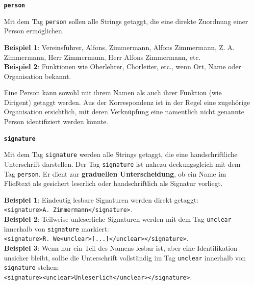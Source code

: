 \documentclass[12pt, a4paper, ngerman, bidi=default]{article}
\begin{document}
    \begin{description}
    \item \textbf{\colorbox{person}{\texttt{person}}}
        
    Mit dem Tag \texttt{\colorbox{person}{person}} sollen alle Strings getaggt, die eine direkte Zuordnung einer Person ermöglichen.
    
    \noindent \textbf{ Beispiel 1}: Vereinsführer, Alfons, Zimmermann, Alfons Zimmermann, Z. A. Zimmermann, Herr Zimmermann, Herr Alfons Zimmermann, etc. \\
    \textbf{ Beispiel 2}: Funktionen wie Oberlehrer, Chorleiter, etc., wenn Ort, Name oder Organisation bekannt. 
    
    Eine Person kann sowohl mit ihrem Namen als auch ihrer Funktion (wie Dirigent) getaggt werden.  
    Aus der Korrespondenz ist in der Regel eine zugehörige Organisation ersichtlich, mit deren Verknüpfung eine namentlich nicht genannte Person identifiziert werden könnte.
    
    \item \textbf{\colorbox{signature}{\texttt{signature}}}
        
    Mit dem Tag \texttt{\colorbox{signature}{signature}} werden alle Strings getaggt, die eine handschriftliche Unterschrift darstellen.  
    Der Tag \texttt{\colorbox{signature}{signature}} ist nahezu deckungsgleich mit dem Tag \texttt{\colorbox{person}{person}}.  
    Er dient zur \textbf{graduellen Unterscheidung}, ob ein Name im Fließtext als gesichert leserlich oder handschriftlich als Signatur vorliegt.  
    
    \noindent \textbf{ Beispiel 1}: Eindeutig lesbare Signaturen werden direkt getaggt:  \\
    \colorbox{VeryLightGray}{\texttt{\textless signature\textgreater A. Zimmermann\textless /signature\textgreater}}. \\
    
    \textbf{ Beispiel 2}: Teilweise unleserliche Signaturen werden mit dem Tag \texttt{\colorbox{unclear}{unclear}} innerhalb von \texttt{\colorbox{signature}{signature}} markiert: \\ 
    \colorbox{VeryLightGray}{\texttt{\textless signature\textgreater R. We\textless unclear\textgreater [...]\textless /unclear\textgreater\textless /signature\textgreater}}. \\  
    
    \textbf{ Beispiel 3}: Wenn nur ein Teil des Namens lesbar ist, aber eine Identifikation unsicher bleibt, sollte die Unterschrift vollständig im Tag \texttt{\colorbox{unclear}{unclear}} innerhalb von \texttt{\colorbox{signature}{signature}} stehen:\\  
    \colorbox{VeryLightGray}{\texttt{\textless signature\textgreater \textless unclear\textgreater Unleserlich\textless /unclear\textgreater \textless /signature\textgreater}.} \\  
    

\end{description}
\end{document}
